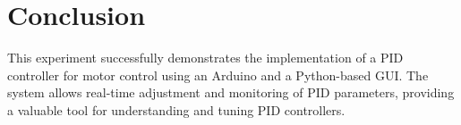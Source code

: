 \documentclass{article}
\begin{document}
\section{Conclusion}
This experiment successfully demonstrates the implementation of a PID controller for motor control using an Arduino and a Python-based GUI. The system allows real-time adjustment and monitoring of PID parameters, providing a valuable tool for understanding and tuning PID controllers.
\end{document}
